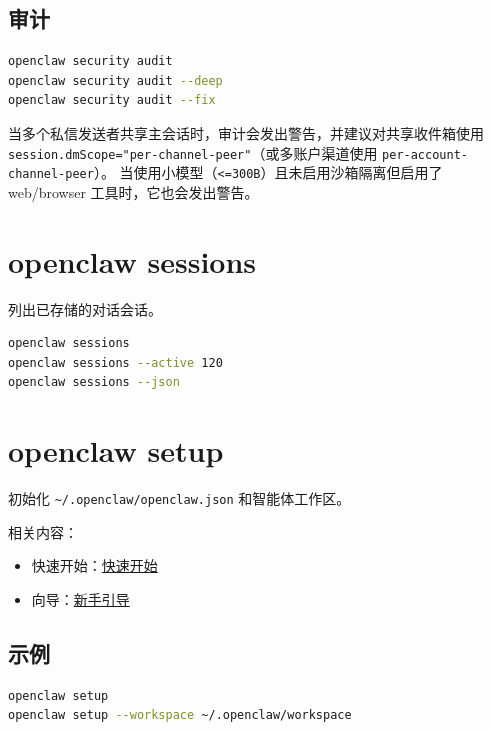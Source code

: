 \subsection{审计}


\begin{lstlisting}[language=bash]
openclaw security audit
openclaw security audit --deep
openclaw security audit --fix
\end{lstlisting}


当多个私信发送者共享主会话时，审计会发出警告，并建议对共享收件箱使用 \texttt{session.dmScope="per-channel-peer"}（或多账户渠道使用 \texttt{per-account-channel-peer}）。
当使用小模型（\texttt{<=300B}）且未启用沙箱隔离但启用了 web/browser 工具时，它也会发出警告。


\clearpage

\section{openclaw sessions}


列出已存储的对话会话。

\begin{lstlisting}[language=bash]
openclaw sessions
openclaw sessions --active 120
openclaw sessions --json
\end{lstlisting}



\clearpage

\section{openclaw setup}


初始化 \texttt{\textasciitilde{}/.openclaw/openclaw.json} 和智能体工作区。

相关内容：

\begin{itemize}
  \item 快速开始：\href{/start/getting-started}{快速开始}
  \item 向导：\href{/start/onboarding}{新手引导}
\end{itemize}


\subsection{示例}


\begin{lstlisting}[language=bash]
openclaw setup
openclaw setup --workspace ~/.openclaw/workspace
\end{lstlisting}


